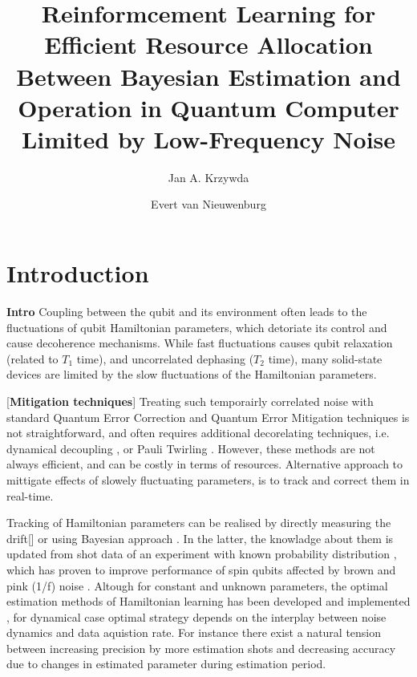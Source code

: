 \documentclass[aps,twocolumn,pra,notitlepage,]{revtex4-2}
\begin{document}
\author{Jan A. Krzywda}
\author{Evert van Nieuwenburg}

\title{Reinformcement Learning for Efficient Resource Allocation Between Bayesian Estimation and Operation in Quantum Computer Limited by Low-Frequency Noise} 


\begin{abstract}

\end{abstract}
\maketitle

\section{Introduction}
\textbf{Intro} 
Coupling between the qubit and its environment often leads to the fluctuations of qubit Hamiltonian parameters, which detoriate its control and cause decoherence mechanisms. While fast fluctuations causes qubit relaxation (related to $T_1$ time), and uncorrelated dephasing ($T_2$ time), many solid-state devices are limited by the slow fluctuations of the Hamiltonian parameters. 

[\textbf{Mitigation techniques}] Treating such temporairly correlated noise with standard Quantum Error Correction \cite{} and Quantum Error Mitigation techniques \cite{} is not straightforward, and often requires additional decorelating techniques, i.e. dynamical decoupling \cite{}, or Pauli Twirling \cite{}. However, these methods are not always efficient, and can be costly in terms of resources. Alternative approach to mittigate effects of slowely fluctuating parameters, is to track and correct them in real-time.

Tracking of Hamiltonian parameters can be realised by directly measuring the drift[] or using Bayesian approach \cite{}. In the latter, the knowladge about them is updated from shot data of an experiment with known probability distribution \cite{}, which has proven to improve performance of spin qubits affected by brown \cite{} and pink (1/f) noise \cite{}. Altough for constant and unknown parameters, the optimal estimation methods of Hamiltonian learning has been developed \cite{} and implemented \cite{}, for dynamical case optimal strategy depends on the interplay between noise dynamics and data aquistion rate. For instance there exist a natural tension between increasing precision by more estimation shots and decreasing accuracy due to changes in estimated parameter during estimation period.
\end{document}
